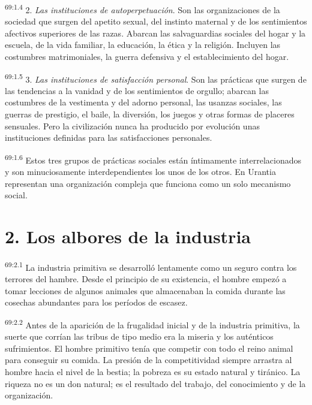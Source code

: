 \par
\textsuperscript{69:1.4} 2. \textit{Las instituciones de autoperpetuación}. Son las organizaciones de la sociedad que surgen del apetito sexual, del instinto maternal y de los sentimientos afectivos superiores de las razas. Abarcan las salvaguardias sociales del hogar y la escuela, de la vida familiar, la educación, la ética y la religión. Incluyen las costumbres matrimoniales, la guerra defensiva y el establecimiento del hogar.

\par
\textsuperscript{69:1.5} 3. \textit{Las instituciones de satisfacción personal}. Son las prácticas que surgen de las tendencias a la vanidad y de los sentimientos de orgullo; abarcan las costumbres de la vestimenta y del adorno personal, las usanzas sociales, las guerras de prestigio, el baile, la diversión, los juegos y otras formas de placeres sensuales. Pero la civilización nunca ha producido por evolución unas instituciones definidas para las satisfacciones personales.

\par
\textsuperscript{69:1.6} Estos tres grupos de prácticas sociales están íntimamente interrelacionados y son minuciosamente interdependientes los unos de los otros. En Urantia representan una organización compleja que funciona como un solo mecanismo social.

\section*{2. Los albores de la industria}
\par
\textsuperscript{69:2.1} La industria primitiva se desarrolló lentamente como un seguro contra los terrores del hambre. Desde el principio de su existencia, el hombre empezó a tomar lecciones de algunos animales que almacenaban la comida durante las cosechas abundantes para los períodos de escasez.

\par
\textsuperscript{69:2.2} Antes de la aparición de la frugalidad inicial y de la industria primitiva, la suerte que corrían las tribus de tipo medio era la miseria y los auténticos sufrimientos. El hombre primitivo tenía que competir con todo el reino animal para conseguir su comida. La presión de la competitividad siempre arrastra al hombre hacia el nivel de la bestia; la pobreza es su estado natural y tiránico. La riqueza no es un don natural; es el resultado del trabajo, del conocimiento y de la organización.

